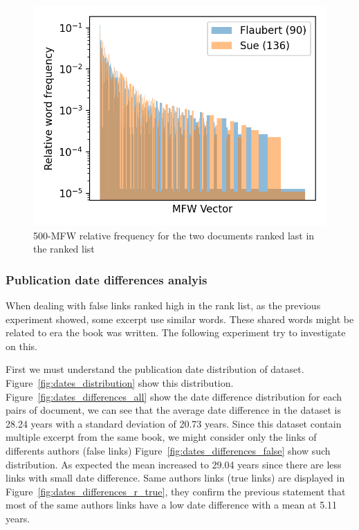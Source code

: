 \begin{figure}
  \includegraphics[width=\linewidth]{img/mfw_vector_last_rl.png}
  \caption{500-MFW relative frequency for the two documents ranked last in the ranked list}
  \label{fig:mfw_vector_last_rl}
\end{figure}

\subsubsection{Publication date differences analyis}

When dealing with false links ranked high in the rank list, as the previous experiment showed, some excerpt use similar words.
These shared words might be related to era the book was written.
The following experiment try to investigate on this.

First we must understand the publication date distribution of dataset. Figure~\ref{fig:dates_distribution} show this distribution.
Figure~\ref{fig:dates_differences_all} show the date difference distribution for each pairs of document, we can see that the average date difference in the dataset is 28.24 years with a standard deviation of 20.73 years.
Since this dataset contain multiple excerpt from the same book, we might consider only the links of differents authors (false links) Figure~\ref{fig:dates_differences_false} show such distribution.
As expected the mean increased to 29.04 years since there are less links with small date difference.
Same authors links (true links) are displayed in Figure~\ref{fig:dates_differences_r_true}, they confirm the previous statement that most of the same authors links have a low date difference with a mean at 5.11 years.

